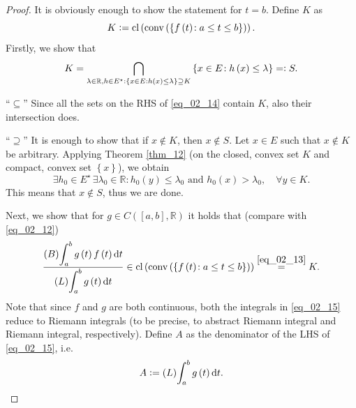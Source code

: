 \documentclass[reqno]{amsart}
\numberwithin{equation}{section}
\theoremstyle{definition}
\theoremstyle{remark}
\newcommand{\Bint}[3]{\br{B}\!\displaystyle\int_{#1}^{#2}{#3}}
\newcommand{\br}[1]{\left(#1\right)}
\newcommand{\C}[2]{C\br{#1,#2}}
\newcommand{\cbr}[1]{\left\{#1\right\}}
\newcommand{\cl}[1]{\clOperator\br{#1}}
\newcommand{\conv}[1]{\convOperator\br{#1}}
\newcommand{\defeq}{\vcentcolon=}
\newcommand{\dt}{\mathrm{d}t}
\newcommand{\eqdef}{=\vcentcolon}
\newcommand{\eqText}[1]{\stackrel{#1}{=}}
\newcommand{\Lint}[3]{\br{L}\!\displaystyle\int_{#1}^{#2}{#3}}
\newcommand{\R}{\mathbb{R}}
\newcommand{\sbr}[1]{\left[#1\right]}
\newcommand{\sE}{E^{\star}}
\newcommand{\st}{\!:}
\newcommand{\theoremRef}[1]{\textrm{Theorem \ref{#1}}}
\DeclareMathOperator{\clOperator}{cl}
\DeclareMathOperator{\convOperator}{conv}
\begin{document}
	\begin{proof}
	It is obviously enough to show the statement for $t=b$. Define $K$ as
	\begin{equation}\label{eq_02_13}
		K\defeq\cl{\conv{\cbr{f\br{t}\st{a}\leq{t}\leq{b}}}}.
	\end{equation}
	Firstly, we show that
	\begin{equation}\label{eq_02_14}
		K=\bigcap_{\lambda\in\R,h\in\sE\,\st\cbr{x\in{E}\,\st{h}\br{x}\leq\lambda}\supseteq{K}}\cbr{x\in{E}\st{h}\br{x}\leq\lambda}\eqdef{S}.
	\end{equation}
	
	\enquote{$\subseteq$} Since all the sets on the RHS of \eqref{eq_02_14} contain $K$, also their intersection does.
	
	\enquote{$\supseteq$} It is enough to show that if $x\notin{K}$, then $x\notin{S}$. Let $x\in{E}$ such that $x\notin{K}$ be arbitrary. Applying \theoremRef{thm_12} (on the closed, convex set $K$ and compact, convex set $\cbr{x}$), we obtain
	\begin{equation*}
		\exists{h}_0\in\sE\,\exists\lambda_0\in\R\st{h}_0\br{y}\leq\lambda_0\text{ and }h_0\br{x}>\lambda_0,\quad\forall{y}\in{K}.
	\end{equation*}
	This means that $x\notin{S}$, thus we are done.
	
	Next, we show that for $g\in\C{\sbr{a,b}}{\R}$ it holds that (compare with \eqref{eq_02_12})
	\begin{equation}\label{eq_02_15}
		\frac{\Bint{a}{b}{g\br{t}f\br{t}\dt}}{\Lint{a}{b}{g\br{t}\dt}}\in\cl{\conv{\cbr{f\br{t}\st{a}\leq{t}\leq{b}}}}\eqText{\eqref{eq_02_13}}K.
	\end{equation}
	Note that since $f$ and $g$ are both continuous, both the integrals in \eqref{eq_02_15} reduce to Riemann integrals (to be precise, to abstract Riemann integral and Riemann integral, respectively). Define $A$ as the denominator of the LHS of \eqref{eq_02_15}, i.e.
	\begin{equation}\label{eq_02_16}
		A\defeq\Lint{a}{b}{g\br{t}\dt}.
	\end{equation}
	

\end{proof}
\end{document}
